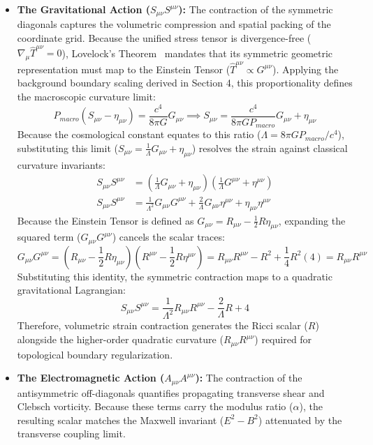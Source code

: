 \begin{itemize}
    \item \textbf{The Gravitational Action ($S_{\mu\nu} S^{\mu\nu}$):} The contraction of the symmetric diagonals captures the volumetric compression and spatial packing of the coordinate grid. Because the unified stress tensor is divergence-free ($\nabla_\mu \hat{T}^{\mu\nu} = 0$), Lovelock's Theorem~\cite{Lovelock1971} mandates that its symmetric geometric representation must map to the Einstein Tensor ($\hat{T}^{\mu\nu} \propto G^{\mu\nu}$). Applying the background boundary scaling derived in Section 4, this proportionality defines the macroscopic curvature limit:
    \begin{equation}
        P_{macro} (S_{\mu\nu} - \eta_{\mu\nu}) = \frac{c^4}{8\pi G}G_{\mu\nu} \implies S_{\mu\nu} = \frac{c^4}{8\pi G P_{macro}}G_{\mu\nu} + \eta_{\mu\nu} 
    \end{equation}
    Because the cosmological constant equates to this ratio ($\Lambda = 8\pi G P_{macro} / c^4$), substituting this limit ($S_{\mu\nu} = \frac{1}{\Lambda} G_{\mu\nu} + \eta_{\mu\nu}$) resolves the strain against classical curvature invariants:
    \begin{align}
        S_{\mu\nu} S^{\mu\nu} &= \left( \frac{1}{\Lambda} G_{\mu\nu} + \eta_{\mu\nu} \right) \left( \frac{1}{\Lambda} G^{\mu\nu} + \eta^{\mu\nu} \right) \nonumber \\
        S_{\mu\nu} S^{\mu\nu} &= \frac{1}{\Lambda^2} G_{\mu\nu} G^{\mu\nu} + \frac{2}{\Lambda} G_{\mu\nu} \eta^{\mu\nu} + \eta_{\mu\nu} \eta^{\mu\nu}
    \end{align}
    Because the Einstein Tensor is defined as $G_{\mu\nu} = R_{\mu\nu} - \frac{1}{2}R \eta_{\mu\nu}$, expanding the squared term ($G_{\mu\nu} G^{\mu\nu}$) cancels the scalar traces: 
    \begin{equation}
        G_{\mu\nu} G^{\mu\nu} = \left( R_{\mu\nu} - \frac{1}{2} R \eta_{\mu\nu} \right)\left( R^{\mu\nu} - \frac{1}{2} R \eta^{\mu\nu} \right) = R_{\mu\nu} R^{\mu\nu} - R^2 + \frac{1}{4}R^2(4) = R_{\mu\nu} R^{\mu\nu}
    \end{equation}
    Substituting this identity, the symmetric contraction maps to a quadratic gravitational Lagrangian:
    \begin{equation}
        S_{\mu\nu} S^{\mu\nu} = \frac{1}{\Lambda^2} R_{\mu\nu} R^{\mu\nu} - \frac{2}{\Lambda} R + 4
    \end{equation}
    Therefore, volumetric strain contraction generates the Ricci scalar ($R$) alongside the higher-order quadratic curvature ($R_{\mu\nu} R^{\mu\nu}$) required for topological boundary regularization.
    
    \item \textbf{The Electromagnetic Action ($A_{\mu\nu} A^{\mu\nu}$):} The contraction of the antisymmetric off-diagonals quantifies propagating transverse shear and Clebsch vorticity. Because these terms carry the modulus ratio ($\alpha$), the resulting scalar matches the Maxwell invariant ($E^2 - B^2$) attenuated by the transverse coupling limit.
\end{itemize}
